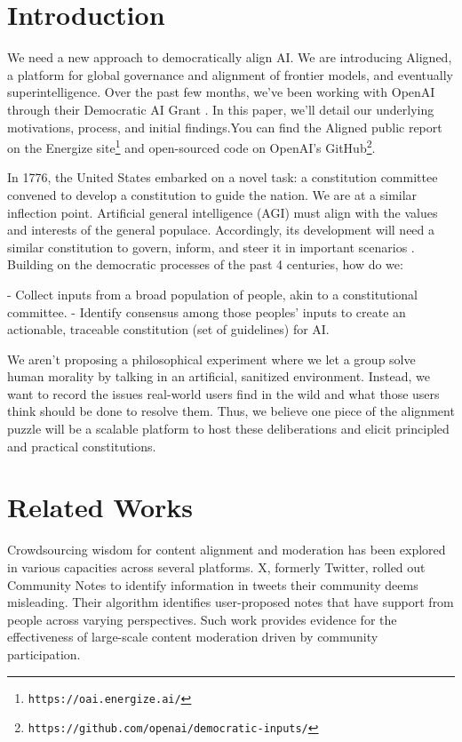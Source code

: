 \documentclass{article}
\begin{document}
\begin{multicols}{2}
\section{Introduction}

We need a new approach to democratically align AI. We are introducing Aligned, a platform for global governance and alignment of frontier models, and eventually superintelligence. Over the past few months, we’ve been working with OpenAI through their Democratic AI Grant \cite{zaremba2023democratic}. In this paper, we’ll detail our underlying motivations, process, and initial findings.You can find the Aligned public report on the Energize site\footnote{\texttt{https://oai.energize.ai/}} and open-sourced code on OpenAI’s GitHub\footnote{\texttt{https://github.com/openai/democratic-inputs/}}.

In 1776, the United States embarked on a novel task: a constitution committee convened to develop a constitution to guide the nation. We are at a similar inflection point. Artificial general intelligence (AGI) must align with the values and interests of the general populace. Accordingly, its development will need a similar constitution to govern, inform, and steer it in important scenarios \cite{altman2023governance}. Building on the democratic processes of the past 4 centuries, how do we:

-  Collect inputs from a broad population of people, akin to a constitutional committee.
-  Identify consensus among those peoples’ inputs to create an actionable, traceable constitution (set of guidelines) for AI.

We aren’t proposing a philosophical experiment where we let a group solve human morality by talking in an artificial, sanitized environment. Instead, we want to record the issues real-world users find in the wild and what those users think should be done to resolve them. Thus, we believe one piece of the alignment puzzle will be a scalable platform to host these deliberations and elicit principled and practical constitutions.

\section{Related Works}

Crowdsourcing wisdom for content alignment and moderation has been explored in various capacities across several platforms. X, formerly Twitter, rolled out Community Notes \cite{birdwatch2022} to identify information in tweets their community deems misleading. Their algorithm identifies user-proposed notes that have support from people across varying perspectives. Such work provides evidence for the effectiveness of large-scale content moderation driven by community participation. 


\end{multicols}
\end{document}
